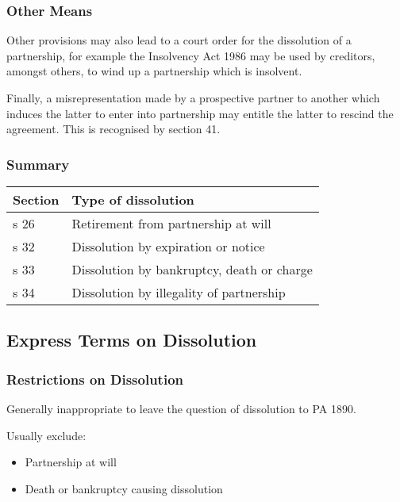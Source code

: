 \documentclass[
]{article}
\providecommand{\tightlist}{%
  \setlength{\itemsep}{0pt}\setlength{\parskip}{0pt}}
\begin{document}
\hypertarget{other-means}{%
\subsubsection{Other Means}\label{other-means}}

Other provisions may also lead to a court order for the dissolution of a
partnership, for example the Insolvency Act 1986 may be used by
creditors, amongst others, to wind up a partnership which is insolvent.

Finally, a misrepresentation made by a prospective partner to another
which induces the latter to enter into partnership may entitle the
latter to rescind the agreement. This is recognised by section 41.

\hypertarget{summary-1}{%
\subsubsection{Summary}\label{summary-1}}

\begin{longtable}[]{@{}ll@{}}
\toprule()
Section & Type of dissolution \\
\midrule()
\endhead
s 26 & Retirement from partnership at will \\
s 32 & Dissolution by expiration or notice \\
s 33 & Dissolution by bankruptcy, death or charge \\
s 34 & Dissolution by illegality of partnership \\
\bottomrule()
\end{longtable}

\hypertarget{express-terms-on-dissolution}{%
\subsection{Express Terms on
Dissolution}\label{express-terms-on-dissolution}}

\hypertarget{restrictions-on-dissolution}{%
\subsubsection{Restrictions on
Dissolution}\label{restrictions-on-dissolution}}

Generally inappropriate to leave the question of dissolution to PA 1890.

Usually exclude:

\begin{itemize}
\tightlist
\item
  Partnership at will
\item
  Death or bankruptcy causing dissolution
\end{itemize}
\end{document}
